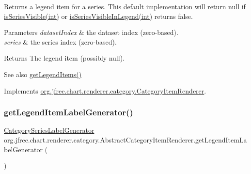 Returns a legend item for a series. This default implementation will return {\ttfamily null} if \mbox{\hyperlink{classorg_1_1jfree_1_1chart_1_1renderer_1_1_abstract_renderer_aa972c5c461d3124942180db93f33ac35}{is\+Series\+Visible(int)}} or \mbox{\hyperlink{classorg_1_1jfree_1_1chart_1_1renderer_1_1_abstract_renderer_acdf46f032810ca5b9c467ab47a8ad087}{is\+Series\+Visible\+In\+Legend(int)}} returns {\ttfamily false}.


\begin{DoxyParams}{Parameters}
{\em dataset\+Index} & the dataset index (zero-\/based). \\
\hline
{\em series} & the series index (zero-\/based).\\
\hline
\end{DoxyParams}
\begin{DoxyReturn}{Returns}
The legend item (possibly {\ttfamily null}).
\end{DoxyReturn}
\begin{DoxySeeAlso}{See also}
\mbox{\hyperlink{classorg_1_1jfree_1_1chart_1_1renderer_1_1category_1_1_abstract_category_item_renderer_a64baac5b575af71d3dfd90791764c1a9}{get\+Legend\+Items()}} 
\end{DoxySeeAlso}


Implements \mbox{\hyperlink{interfaceorg_1_1jfree_1_1chart_1_1renderer_1_1category_1_1_category_item_renderer_ab9269f34c8b4859211e4f4472636c93c}{org.\+jfree.\+chart.\+renderer.\+category.\+Category\+Item\+Renderer}}.

\mbox{\label{classorg_1_1jfree_1_1chart_1_1renderer_1_1category_1_1_abstract_category_item_renderer_a09bd5701cd60505b3463b9e59a3ae70a}} 
\subsubsection{\texorpdfstring{get\+Legend\+Item\+Label\+Generator()}{getLegendItemLabelGenerator()}}
{\footnotesize\ttfamily \mbox{\hyperlink{interfaceorg_1_1jfree_1_1chart_1_1labels_1_1_category_series_label_generator}{Category\+Series\+Label\+Generator}} org.\+jfree.\+chart.\+renderer.\+category.\+Abstract\+Category\+Item\+Renderer.\+get\+Legend\+Item\+Label\+Generator (\begin{DoxyParamCaption}{ }\end{DoxyParamCaption})}

